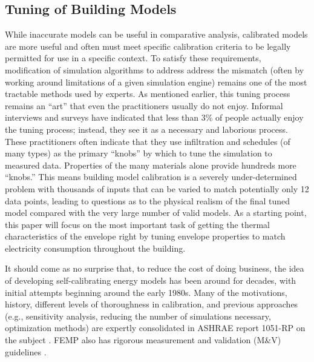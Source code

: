 \documentclass[preprint, review, 12pt]{elsarticle}
\begin{document}
\subsection{Tuning of Building Models}
While inaccurate models can be useful in comparative analysis, calibrated models are more useful and often must meet specific calibration criteria to be legally permitted for use in a specific context. To satisfy these requirements, modification of simulation algorithms to address address the mismatch (often by working around limitations of a given simulation engine) remains one of the most tractable methods used by experts. As mentioned earlier, this tuning process remains an ``art'' that even the practitioners usually do not enjoy. Informal interviews and surveys have indicated that less than 3\% of people actually enjoy the tuning process; instead, they see it as a necessary and laborious process. These practitioners often indicate that they use infiltration and schedules (of many types) as the primary ``knobs'' by which to tune the simulation to measured data. Properties of the many materials alone provide hundreds more ``knobs.'' This means building model calibration is a severely under-determined problem with thousands of inputs that can be varied to match potentially only 12 data points, leading to questions as to the physical realism of the final tuned model compared with the very large number of valid models. As a starting point, this paper will focus on the most important task of getting the thermal characteristics of the envelope right by tuning envelope properties to match electricity consumption throughout the building.

It should come as no surprise that, to reduce the cost of doing business, the idea of developing self-calibrating energy models has been around for decades, with initial attempts beginning around the early 1980s. Many of the motivations, history, different levels of thoroughness in calibration, and previous approaches (e.g., sensitivity analysis, reducing the number of simulations necessary, optimization methods) are expertly consolidated in ASHRAE report 1051-RP on the subject \cite{cit:reddy2006}. FEMP also has rigorous measurement and validation (M\&V) guidelines \cite{cit:femp2008}.
\end{document}
